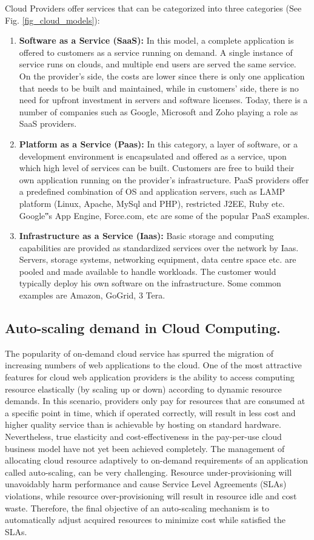 \documentclass[../main.tex]{subfiles}
\begin{document}
	Cloud Providers offer services that can be categorized into three categories (See Fig. \ref{fig_cloud_models}):
\begin{enumerate}
\item \textbf{Software as a Service (SaaS):} In this model, a complete application is offered to customers as a service running on demand. A single instance of service runs on clouds, and multiple end users are served the same service. On the provider's side, the costs are lower since there is only one application that needs to be built and maintained, while in customers' side, there is no need for upfront investment in servers and software licenses. Today, there is a number of companies such as Google, Microsoft and Zoho playing a role as SaaS providers.
\item \textbf{Platform as a Service (Paas):} In this category, a layer of software, or a development environment is encapsulated and offered as a service, upon which high level of services can be built. Customers are free to build their own application running on the provider's infrastructure. PaaS
providers offer a predefined combination of OS and application servers, such as LAMP platform
(Linux, Apache, MySql and PHP), restricted J2EE, Ruby etc. Google‟s App Engine, Force.com,
etc are some of the popular PaaS examples.
\item \textbf{Infrastructure as a Service (Iaas):} Basic storage and computing capabilities are provided as standardized services over the network by Iaas. Servers, storage systems, networking equipment, data
centre space etc. are pooled and made available to handle workloads. The customer would
typically deploy his own software on the infrastructure. Some common examples are Amazon,
GoGrid, 3 Tera.
\end{enumerate}

\subsection{Auto-scaling demand in Cloud Computing.}
\label{auto_scale}
The popularity of on-demand cloud service has spurred the migration of increasing numbers of web applications to the cloud. One of the most attractive features for cloud web application providers is the ability to access computing
resource elastically (by scaling up or down) according to dynamic resource demands. In this scenario, providers only pay for resources that are consumed at a specific point in time, which if operated correctly, will result in less cost
and higher quality service than is achievable by hosting on standard hardware. Nevertheless, true elasticity and cost-effectiveness in the
pay-per-use cloud business model have not yet been achieved completely. The management of allocating cloud resource adaptively to on-demand requirements of an application called auto-scaling, can be very challenging. Resource
under-provisioning will unavoidably harm performance and cause Service Level Agreements (SLAs) violations, while resource over-provisioning will result in resource idle and cost waste. Therefore, the final objective of an auto-scaling mechanism is to automatically adjust acquired resources to minimize cost while satisfied the SLAs.
\end{document}
